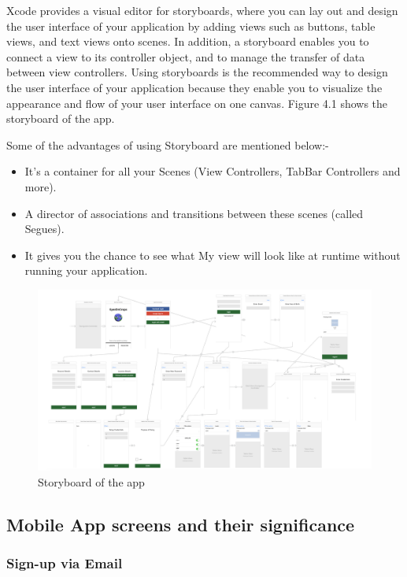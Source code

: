 Xcode provides a visual editor for storyboards, where you can lay out and design the user interface of your application by adding views such as buttons, table views, and text views onto scenes. In addition, a storyboard enables you to connect a view to its controller object, and to manage the transfer of data between view controllers. Using storyboards is the recommended way to design the user interface of your application because they enable you to visualize the appearance and flow of your user interface on one canvas. Figure 4.1 shows the storyboard of the app. 

Some of the advantages of using Storyboard are mentioned below:-
\begin{itemize}
    \item It's a container for all your Scenes (View Controllers, TabBar Controllers and more).
    \item A director of associations and transitions between these scenes (called Segues).
    \item It gives you the chance to see what My view will look like at runtime without running your application.
\end{itemize}

\newpage

    \begin{figure}[H]
            \centering
            \includegraphics[width=\linewidth]{figures/ch4/storyboard_final.png}
            \caption{\label{fig:wireframe_3} Storyboard of the app}
    \end{figure}
    
\subsection{Mobile App screens and their significance}

\subsubsection{Sign-up via Email}

